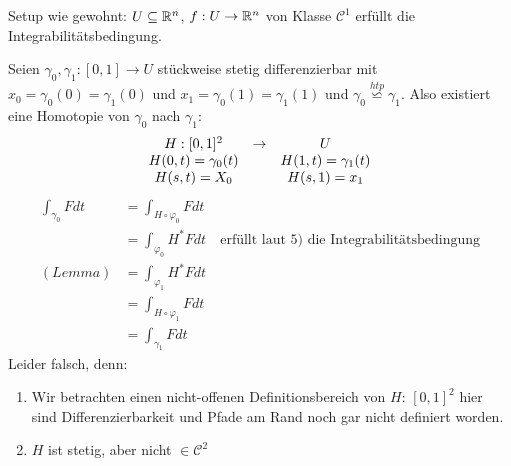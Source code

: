 \documentclass[main.tex]{subfiles}
\begin{document}
\begin{Beweis}[Illegal]
  Setup wie gewohnt: $U \subseteq \mathbb{R}^n$, $f : U \to \mathbb{R}^n$ von Klasse $\mathcal{C}^1$ erfüllt die Integrabilitätsbedingung.

  Seien $\gamma_0, \gamma_1 : [0,1] \to U$ stückweise stetig differenzierbar mit $x_0 = \gamma_0(0) = \gamma_1(0)$ und $x_1 = \gamma_0(1) = \gamma_1(1)$ und $\gamma_0 \stackrel{htp}{\backsimeq} \gamma_1$.
  Also existiert eine Homotopie von $\gamma_0$ nach $\gamma_1$:
  $$\begin{array}{c c c}
    H:[0,1]^2 & \to & U \\
    H(0,t) = \gamma_0(t) & & H(1,t) = \gamma_1(t) \\
    H(s,t) = X_0 & & H(s,1) = x_1
  \end{array}$$
  $$\begin{aligned}
    \int_{\gamma_0} F dt & = \int_{H \circ \varphi_0} F dt \\
    & = \int_{\varphi_0} H^* F dt \quad \text{erfüllt laut 5) die Integrabilitätsbedingung} \\
    (Lemma) & = \int_{\varphi_1} H^* F dt \\
    & = \int_{H \circ \varphi_1} F dt \\
    & = \int_{\gamma_1} F dt
  \end{aligned}$$
  Leider falsch, denn:
  \begin{enumerate}
    \item Wir betrachten einen nicht-offenen Definitionsbereich von $H$: $[0,1]^2$ hier sind Differenzierbarkeit und Pfade am Rand noch gar nicht definiert worden.
    \item $H$ ist stetig, aber nicht $\in \mathcal{C}^2$
  \end{enumerate}
\end{Beweis}
\end{document}
